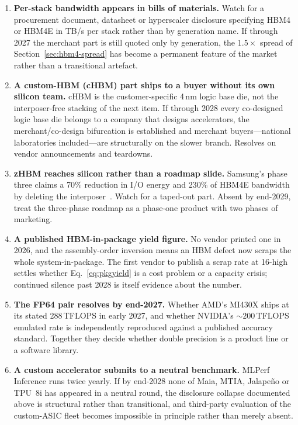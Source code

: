 \begin{enumerate}
  \item \textbf{Per-stack bandwidth appears in bills of materials.} Watch for a procurement document, datasheet or hyperscaler disclosure specifying HBM4 or HBM4E in TB/s per stack rather than by generation name. If through 2027 the merchant part is still quoted only by generation, the $1.5\times$ spread of Section~\ref{sec:hbm4-spread} has become a permanent feature of the market rather than a transitional artefact.
  \item \textbf{A custom-HBM (cHBM) part ships to a buyer without its own silicon team.} cHBM is the customer-specific 4\,nm logic base die, not the interposer-free stacking of the next item. If through 2028 every co-designed logic base die belongs to a company that designs accelerators, the merchant/co-design bifurcation is established and merchant buyers---national laboratories included---are structurally on the slower branch. Resolves on vendor announcements and teardowns.
  \item \textbf{zHBM reaches silicon rather than a roadmap slide.} Samsung's phase three claims a 70\% reduction in I/O energy and 230\% of HBM4E bandwidth by deleting the interposer~\cite{hc2026-chbm}. Watch for a taped-out part. Absent by end-2029, treat the three-phase roadmap as a phase-one product with two phases of marketing.
  \item \textbf{A published HBM-in-package yield figure.} No vendor printed one in 2026, and the assembly-order inversion means an HBM defect now scraps the whole system-in-package. The first vendor to publish a scrap rate at 16-high settles whether Eq.~\eqref{eq:pkgyield} is a cost problem or a capacity crisis; continued silence past 2028 is itself evidence about the number.
  \item \textbf{The FP64 pair resolves by end-2027.} Whether AMD's MI430X ships at its stated 288\,TFLOPS in early 2027, and whether NVIDIA's ${\sim}200$\,TFLOPS emulated rate is independently reproduced against a published accuracy standard. Together they decide whether double precision is a product line or a software library.
  \item \textbf{A custom accelerator submits to a neutral benchmark.} MLPerf Inference runs twice yearly. If by end-2028 none of Maia, MTIA, Jalape\~no or TPU~8i has appeared in a neutral round, the disclosure collapse documented above is structural rather than transitional, and third-party evaluation of the custom-ASIC fleet becomes impossible in principle rather than merely absent.

\end{enumerate}
